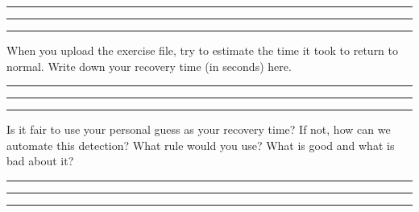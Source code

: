 \documentclass[11pt]{article}
\begin{document}
\vspace{1.5em}
\rule{16cm}{0.5pt}

\vspace{1.5em}
\rule{16cm}{0.5pt}

\vspace{1.5em}
\rule{16cm}{0.5pt}

When you upload the exercise file, try to estimate the time it took to
return to normal. Write down your recovery time (in seconds) here.

\vspace{1.5em}
\rule{16cm}{0.5pt}

\vspace{1.5em}
\rule{16cm}{0.5pt}

\vspace{1.5em}
\rule{16cm}{0.5pt}

Is it fair to use your personal guess as your recovery time? If not, how
can we automate this detection? What rule would you use? What is good
and what is bad about it?

\vspace{1.5em}
\rule{16cm}{0.5pt}

\vspace{1.5em}
\rule{16cm}{0.5pt}

\vspace{1.5em}
\rule{16cm}{0.5pt}
\end{document}
